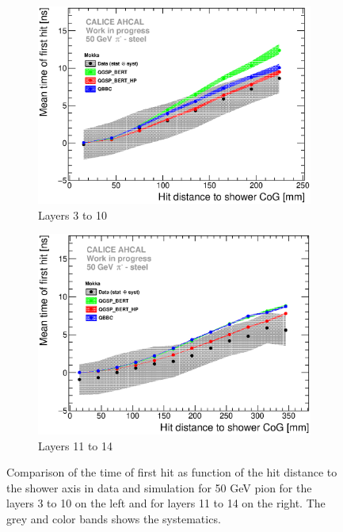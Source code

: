 \begin{figure}[htbp!]
	\begin{subfigure}[t]{0.49\textwidth}
		\centering
		\includegraphics[width=1\textwidth]{../Thesis_Plots/Timing/Pions/Plots/ComparisonToSim/Time_Radius_50GeV_SSF_Mokka.eps}
		\caption{Layers 3 to 10} \label{fig:Radius_SSF_SimData_50GeV}
	\end{subfigure}
	\hfill
	\begin{subfigure}[t]{0.49\textwidth}
		\centering
		\includegraphics[width=1\textwidth]{../Thesis_Plots/Timing/Pions/Plots/ComparisonToSim/Time_Radius_50GeV_BL_Mokka.eps}
		\caption{Layers 11 to 14} \label{fig:Radius_BL_SimData_50GeV}
	\end{subfigure}
	\caption{Comparison of the time of first hit as function of the hit distance to the shower axis in data and \mokka simulation for 50 GeV pion for the layers 3 to 10 on the left and for layers 11 to 14 on the right. The grey and color bands shows the systematics.}
	\label{fig:Radius_SSF_SimData_50GeVComparison}
\end{figure}

